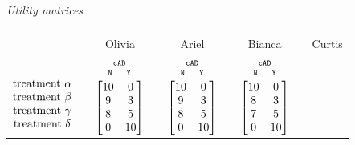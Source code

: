\documentclass[a4paper,12pt,%
onecolumn,oneside,article,%
british%
]{memoir}
\theoremstyle{remark}
\theoremstyle{innote}
\renewcommand*{\|}[1][]{\nonscript\:#1\vert\nonscript\:\mathopen{}}
\newcommand*{\cad}{\texttt{cAD}}
\newcommand*{\yes}{\texttt{Y}}
\newcommand*{\no}{\texttt{N}}
\begin{document}
\medskip
\begin{table}
  \centering
  \textit{Utility matrices}\\
  \begin{tabular}{lccccccc}
    \hline\\[-1.5\jot]
    &{\small Olivia} &&{\small Ariel} &&{\small Bianca} &&{\small Curtis}
    \\[\jot]
    $\begin{matrix}&\\[1.5\jot]
      \text{treatment }\alpha\\ 
      \text{treatment }\beta\\ 
      \text{treatment }\gamma\\ 
      \text{treatment }\delta
    \end{matrix}$
    &
    $
    \begin{gathered}
      {\scriptstyle\cad}\\[-2\jot]
      \begin{smallmatrix}
        \no\enspace &\enspace\yes
      \end{smallmatrix}\\[-\jot]
\begin{bmatrix}10&0\\9&3\\8&5\\0&10\end{bmatrix}
\end{gathered}
$
    &&
    $\begin{gathered}
      {\scriptstyle\cad}\\[-2\jot]
      \begin{smallmatrix}
        \no\enspace &\enspace\yes
      \end{smallmatrix}\\[-\jot]
      \begin{bmatrix}10&0\\9&3\\8&5\\0&10\end{bmatrix}\end{gathered}$
    &&
    $\begin{gathered}
      {\scriptstyle\cad}\\[-2\jot]
      \begin{smallmatrix}
        \no\enspace &\enspace\yes
      \end{smallmatrix}\\[-\jot]
      \begin{bmatrix}10&0\\8&3\\7&5\\0&10\end{bmatrix}\end{gathered}$

\end{tabular}
\end{table}
\end{document}
